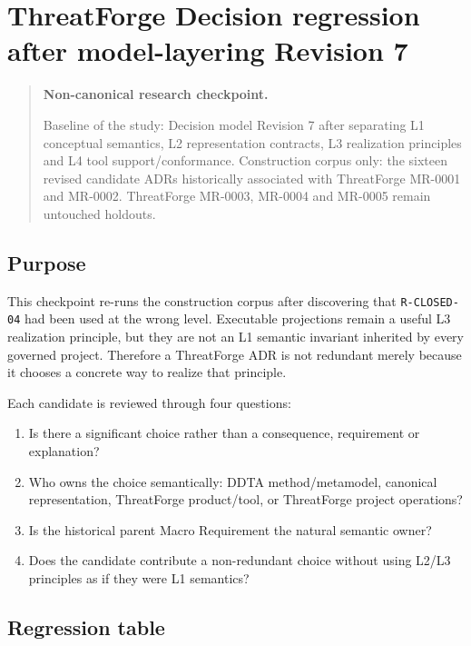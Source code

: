 \documentclass[
  10pt,
  a4paper,
]{article}
\author{}
\date{}
\providecommand{\tightlist}{%
  \setlength{\itemsep}{0pt}\setlength{\parskip}{0pt}}
\begin{document}
{
\hypersetup{linkcolor=}
\setcounter{tocdepth}{3}
\tableofcontents
}
\section{ThreatForge Decision regression after model-layering Revision
7}\label{threatforge-decision-regression-after-model-layering-revision-7}

\begin{quote}
\textbf{Non-canonical research checkpoint.}

Baseline of the study: Decision model Revision 7 after separating L1
conceptual semantics, L2 representation contracts, L3 realization
principles and L4 tool support/conformance. Construction corpus only:
the sixteen revised candidate ADRs historically associated with
ThreatForge MR-0001 and MR-0002. ThreatForge MR-0003, MR-0004 and
MR-0005 remain untouched holdouts.
\end{quote}

\subsection{Purpose}\label{purpose}

This checkpoint re-runs the construction corpus after discovering that
\texttt{R-CLOSED-04} had been used at the wrong level. Executable
projections remain a useful L3 realization principle, but they are not
an L1 semantic invariant inherited by every governed project. Therefore
a ThreatForge ADR is not redundant merely because it chooses a concrete
way to realize that principle.

Each candidate is reviewed through four questions:

\begin{enumerate}
\def\labelenumi{\arabic{enumi}.}
\tightlist
\item
  Is there a significant choice rather than a consequence, requirement
  or explanation?
\item
  Who owns the choice semantically: DDTA method/metamodel, canonical
  representation, ThreatForge product/tool, or ThreatForge project
  operations?
\item
  Is the historical parent Macro Requirement the natural semantic owner?
\item
  Does the candidate contribute a non-redundant choice without using
  L2/L3 principles as if they were L1 semantics?
\end{enumerate}

\subsection{Regression table}\label{regression-table}
\end{document}
